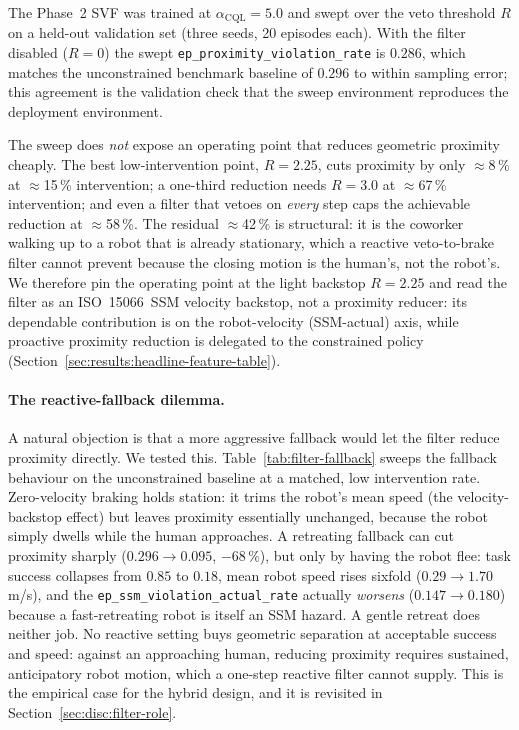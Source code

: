 \documentclass[11pt,a4paper]{report}
\newcommand{\ssm}{SSM}
\newcommand{\iso}{ISO~15066}
\begin{document}
The Phase~2 SVF was trained at $\alpha_{\mathrm{CQL}} = 5.0$ and
swept over the veto threshold $R$ on a held-out validation set (three
seeds, 20 episodes each). With the filter disabled ($R = 0$) the
swept \texttt{ep\_proximity\_violation\_rate} is $0.286$, which
matches the unconstrained benchmark baseline of $0.296$ to within
sampling error; this agreement is the validation check that the
sweep environment reproduces the deployment environment.

The sweep does \emph{not} expose an operating point that reduces
geometric proximity cheaply. The best low-intervention point,
$R = 2.25$, cuts proximity by only $\approx$8\,\% at
$\approx$15\,\% intervention; a one-third reduction needs $R = 3.0$
at $\approx$67\,\% intervention; and even a filter that vetoes on
\emph{every} step caps the achievable reduction at $\approx$58\,\%.
The residual $\approx$42\,\% is structural: it is the coworker
walking up to a robot that is already stationary, which a reactive
veto-to-brake filter cannot prevent because the closing motion is the
human's, not the robot's. We therefore pin the operating point at the
light backstop $R = 2.25$ and read the filter as an \iso{}~\ssm{}
velocity backstop, not a proximity reducer: its dependable
contribution is on the robot-velocity (\ssm{}-actual) axis, while
proactive proximity reduction is delegated to the constrained policy
(Section~\ref{sec:results:headline-feature-table}).

\paragraph{The reactive-fallback dilemma.}
A natural objection is that a more aggressive fallback would let the
filter reduce proximity directly. We tested this. Table~\ref{tab:filter-fallback}
sweeps the fallback behaviour on the unconstrained baseline at a
matched, low intervention rate. Zero-velocity braking holds station:
it trims the robot's mean speed (the velocity-backstop effect) but
leaves proximity essentially unchanged, because the robot simply
dwells while the human approaches. A retreating fallback can cut
proximity sharply ($0.296 \rightarrow 0.095$, $-68\,\%$), but only by
having the robot flee: task success collapses from $0.85$ to $0.18$,
mean robot speed rises sixfold ($0.29 \rightarrow 1.70$\,m/s), and the
\texttt{ep\_ssm\_violation\_actual\_rate} actually \emph{worsens}
($0.147 \rightarrow 0.180$) because a fast-retreating robot is itself
an \ssm{} hazard. A gentle retreat does neither job. No reactive
setting buys geometric separation at acceptable success and speed:
against an approaching human, reducing proximity requires sustained,
anticipatory robot motion, which a one-step reactive filter cannot
supply. This is the empirical case for the hybrid design, and it is
revisited in Section~\ref{sec:disc:filter-role}.
\end{document}
